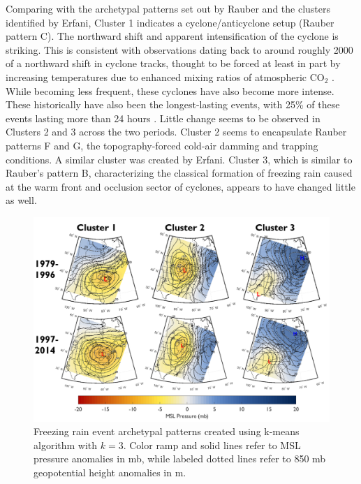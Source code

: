 \documentclass[twocol]{ametsoc}
\begin{document}
Comparing with the archetypal patterns set out by Rauber and the clusters identified by Erfani, Cluster 1 indicates a cyclone/anticyclone setup (Rauber pattern C). The northward shift and apparent intensification of the cyclone is striking. This is consistent with observations dating back to around roughly 2000 of a northward shift in cyclone tracks, thought to be forced at least in part by increasing temperatures due to enhanced mixing ratios of atmospheric CO$_2$ \citep{mccabe2001trends}. While becoming less frequent, these cyclones have also become more intense. These historically have also been the longest-lasting events, with 25\% of these events lasting more than 24 hours \citep{rauber2001synoptic}. Little change seems to be observed in Clusters 2 and 3 across the two periods. Cluster 2 seems to encapsulate Rauber patterns F and G, the topography-forced cold-air damming and trapping conditions. A similar cluster was created by Erfani. Cluster 3, which is similar to Rauber's pattern B, characterizing the classical formation of freezing rain caused at the warm front and occlusion sector of cyclones, appears to have changed little as well.

\begin{figure}
\centering
\includegraphics[width=\textwidth]{Clusters.PNG}
\caption{\label{fig:clusters} Freezing rain event archetypal patterns created using k-means algorithm with $k=3$. Color ramp and solid lines refer to MSL pressure anomalies in mb, while labeled dotted lines refer to 850 mb geopotential height anomalies in m.}
\end{figure}
\end{document}

